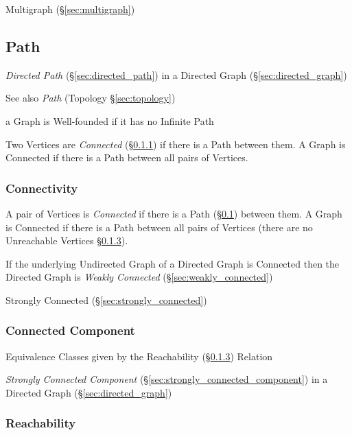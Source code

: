 Multigraph (\S\ref{sec:multigraph})



\subsection{Path}\label{sec:graph_path}

\emph{Directed Path} (\S\ref{sec:directed_path}) in a Directed Graph
(\S\ref{sec:directed_graph})

\fist See also \emph{Path} (Topology \S\ref{sec:topology})

a Graph is Well-founded if it has no Infinite Path

Two Vertices are \emph{Connected} (\S\ref{sec:connectivity}) if there
is a Path between them. A Graph is Connected if there is a Path
between all pairs of Vertices.



\subsubsection{Connectivity}\label{sec:connectivity}

A pair of Vertices is \emph{Connected} if there is a Path
(\S\ref{sec:graph_path}) between them. A Graph is Connected if there
is a Path between all pairs of Vertices (there are no Unreachable
Vertices \S\ref{sec:reachability}).

If the underlying Undirected Graph of a Directed Graph is Connected
then the Directed Graph is \emph{Weakly Connected}
(\S\ref{sec:weakly_connected})

Strongly Connected (\S\ref{sec:strongly_connected})



\subsubsection{Connected Component}\label{sec:connected_component}

Equivalence Classes given by the Reachability
(\S\ref{sec:reachability}) Relation

\emph{Strongly Connected Component}
(\S\ref{sec:strongly_connected_component}) in a Directed Graph
(\S\ref{sec:directed_graph})



\subsubsection{Reachability}\label{sec:reachability}

